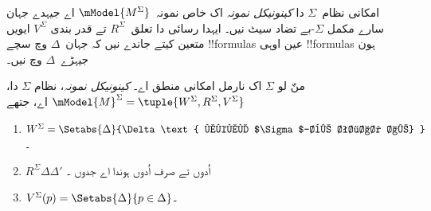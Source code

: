 \documentclass[../../../include/open-logic-section]{subfiles}
\begin{document}


امکانی نظام~$\Sigma$ دا \emph{کینونیکل نمونہ} اک خاص نمونہ~$\mModel{M^\Sigma}$ اے جیہدے جہان سارے مکمل $\Sigma$-بے تضاد سیٹ نیں۔ ایہدا رسائی دا تعلق~$R^\Sigma$ تے قدر بندی $V^\Sigma$ ایویں متعین کیتے جاندے نیں کہ جہان~$\Delta$ وچ سچے !!{formula}s عین اوہی !!{formula}s ہون جیہڑے~$\Delta$ وچ نیں۔

\begin{defn}
  منّ لو $\Sigma$ اک نارمل امکانی منطق اے۔ \emph{کینونیکل نمونہ}، نظام
  $\Sigma$ دا، $\mModel{M}^\Sigma = \tuple{W^\Sigma, R^\Sigma,
    V^\Sigma}$ اے، جتھے
  \begin{enumerate}
  \item $W^\Sigma = \Setabs{ \Delta }{\Delta \text{
      مکمل $\Sigma$-بے تضاد اے} }$۔
  \item $R^\Sigma \Delta\Delta'$ اُدوں تے صرف اُدوں ہوندا اے جدوں
    ۔
  \item $V^\Sigma(p) = \Setabs{\Delta}{p \in \Delta}$۔
  \end{enumerate}
\end{defn}
\end{document}
